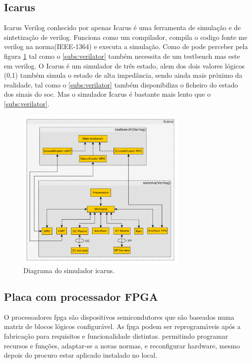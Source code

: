 \subsection{Icarus}
\label{subs:icarus}

Icarus Verilog conhecido por apenas Icarus é uma ferramenta de simulação e de sintetização de verilog. Funciona como um compilador, compila o codigo fonte me verilog na norma(IEEE-1364) e executa a simulação. Como de pode perceber pela figura \ref{fig:icarus} tal como o \ref{subs:verilator} também necessita de um testbench mas este em verilog. O Icarus é um simulador de três estado, alem dos dois valores lógicos (0,1) também simula o estado de alta impedância, sendo ainda mais próximo da realidade, tal como o \ref{subs:verilator} também disponibiliza o ficheiro do estado dos sinais do \acrshort{soc}. Mas o simulador Icarus é bastante mais lento que o \ref{subs:verilator}.



\begin{figure}[!htb]
  \centering
  \includegraphics[width=0.75\textwidth]{grafos/Icarus.pdf}
  \caption[Diagrama do simulador icarus]{Diagrama do simulador icarus.}
  \label{fig:icarus}
\end{figure}

\subsection{Placa com processador FPGA}

O processadores \acrlong{fpga} são dispositivos semicondutores que são baseados numa matriz de blocos lógicos configurável. As \acrshort{fpga} podem ser reprogramáveis após a fabricação para requisitos e funcionalidade distintas. permitindo programar recursos e funções, adaptar-se a novas normas, e reconfigurar hardware, mesmo depois do procuro estar aplicado instalado no local.

